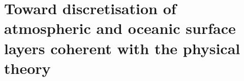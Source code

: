 \chapter{Toward discretisation of atmospheric and oceanic surface
layers coherent with the physical theory}
\label{ch:ND}
\minitoc





